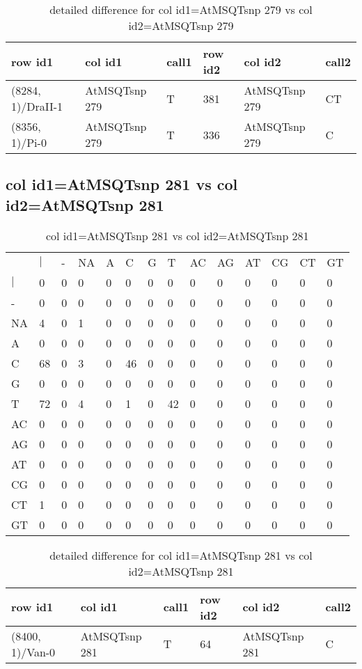 \begin{center}
\begin{longtable}{|l|l|l|l|l|l|}
\caption{detailed difference for col id1=AtMSQTsnp 279 vs col id2=AtMSQTsnp 279} \label{table_dm619}\\
\hline
row id1&col id1&call1&row id2&col id2&call2\\
\hline
(8284, 1)/DraII-1&AtMSQTsnp 279&T&381&AtMSQTsnp 279&CT\\
(8356, 1)/Pi-0&AtMSQTsnp 279&T&336&AtMSQTsnp 279&C\\
\hline
\end{longtable}
\end{center}

\subsection{col id1=AtMSQTsnp 281 vs col id2=AtMSQTsnp 281}
\begin{center}
\begin{longtable}{|l|l|l|l|l|l|l|l|l|l|l|l|l|l|}
\caption{col id1=AtMSQTsnp 281 vs col id2=AtMSQTsnp 281} \label{table_dm620}\\
\hline
\\
\hline
&$|$&-&NA&A&C&G&T&AC&AG&AT&CG&CT&GT\\
$|$&0&0&0&0&0&0&0&0&0&0&0&0&0\\
-&0&0&0&0&0&0&0&0&0&0&0&0&0\\
NA&4&0&1&0&0&0&0&0&0&0&0&0&0\\
A&0&0&0&0&0&0&0&0&0&0&0&0&0\\
C&68&0&3&0&46&0&0&0&0&0&0&0&0\\
G&0&0&0&0&0&0&0&0&0&0&0&0&0\\
T&72&0&4&0&1&0&42&0&0&0&0&0&0\\
AC&0&0&0&0&0&0&0&0&0&0&0&0&0\\
AG&0&0&0&0&0&0&0&0&0&0&0&0&0\\
AT&0&0&0&0&0&0&0&0&0&0&0&0&0\\
CG&0&0&0&0&0&0&0&0&0&0&0&0&0\\
CT&1&0&0&0&0&0&0&0&0&0&0&0&0\\
GT&0&0&0&0&0&0&0&0&0&0&0&0&0\\
\hline
\end{longtable}
\end{center}

\begin{center}
\begin{longtable}{|l|l|l|l|l|l|}
\caption{detailed difference for col id1=AtMSQTsnp 281 vs col id2=AtMSQTsnp 281} \label{table_dm621}\\
\hline
row id1&col id1&call1&row id2&col id2&call2\\
\hline
(8400, 1)/Van-0&AtMSQTsnp 281&T&64&AtMSQTsnp 281&C\\
\hline
\end{longtable}
\end{center}

